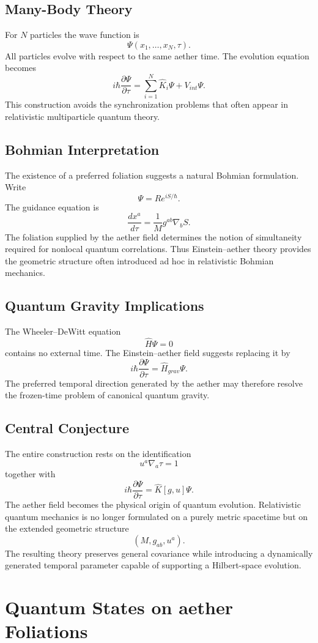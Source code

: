 \documentclass[11pt]{book}
\begin{document}
\section{Many-Body Theory}
For $N$ particles the wave function is
\[\Psi(x_1,\ldots,x_N,\tau).\]
All particles evolve with respect to the same aether time.
The evolution equation becomes
\[i\hbar\frac{\partial\Psi}{\partial\tau}=
\sum_{i=1}^{N}\hat K_i\Psi+V_{int}\Psi .\]
This construction avoids the synchronization problems that often
appear in relativistic multiparticle quantum theory.

\section{Bohmian Interpretation}
The existence of a preferred foliation suggests a natural Bohmian
formulation.
Write
\[\Psi=Re^{iS/\hbar}.\]
The guidance equation is
\[\frac{dx^a}{d\tau}=\frac{1}{M}g^{ab}\nabla_b S .\]
The foliation supplied by the aether field determines the notion of
simultaneity required for nonlocal quantum correlations.
Thus Einstein--aether theory provides the geometric structure often
introduced ad hoc in relativistic Bohmian mechanics.

\section{Quantum Gravity Implications}
The Wheeler--DeWitt equation
\[\hat H\Psi=0\]
contains no external time.
The Einstein--aether field suggests replacing it by
\[i\hbar\frac{\partial\Psi}{\partial\tau}=\hat H_{grav}\Psi .\]
The preferred temporal direction generated by the aether may
therefore resolve the frozen-time problem of canonical quantum gravity.

\section{Central Conjecture}
The entire construction rests on the identification
\[\boxed{u^a\nabla_a\tau=1}\]
together with
\[\boxed{i\hbar\frac{\partial\Psi}{\partial\tau}=\hat K[g,u]\Psi.}\]
The aether field becomes the physical origin of quantum evolution.
Relativistic quantum mechanics is no longer formulated on a purely
metric spacetime but on the extended geometric structure
\[(M,g_{ab},u^a).\]
The resulting theory preserves general covariance while introducing a
dynamically generated temporal parameter capable of supporting a
Hilbert-space evolution.

\chapter{Quantum States on aether Foliations}
\end{document}
